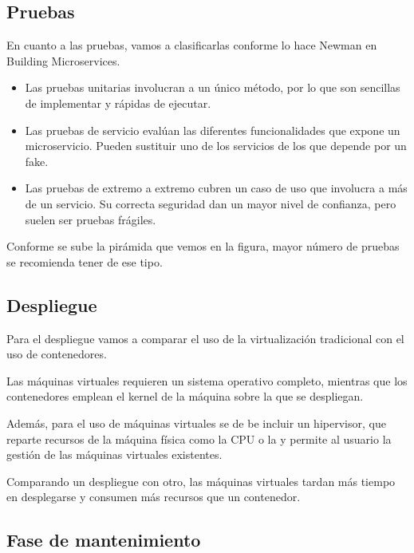 \documentclass[11pt,a4paper]{article}
\begin{document}
\subsection{Pruebas}

En cuanto a las pruebas, vamos a clasificarlas conforme lo hace Newman en Building Microservices.

\begin{itemize}

\item Las pruebas unitarias involucran a un único método, por lo que son sencillas de implementar y rápidas de ejecutar.

\item Las pruebas de servicio evalúan las diferentes funcionalidades que expone un microservicio. Pueden sustituir uno de los servicios de los que depende por un fake.

\item Las pruebas de extremo a extremo cubren un caso de uso que involucra a más de un servicio. Su correcta seguridad dan un mayor nivel de confianza, pero suelen ser pruebas frágiles.

\end{itemize}

Conforme se sube la pirámida que vemos en la figura, mayor número de pruebas se recomienda tener de ese tipo.

\subsection{Despliegue}

Para el despliegue vamos a comparar el uso de la virtualización tradicional con el uso de contenedores.

Las máquinas virtuales requieren un sistema operativo completo, mientras que los contenedores emplean el kernel de la máquina sobre la que se despliegan.

Además, para el uso de máquinas virtuales se de be incluir un hipervisor, que reparte recursos de la máquina física como la CPU o la y permite al usuario la gestión de las máquinas virtuales existentes.

Comparando un despliegue con otro, las máquinas virtuales tardan más tiempo en desplegarse y consumen más recursos que un contenedor.

\subsection{Fase de mantenimiento}
\end{document}

